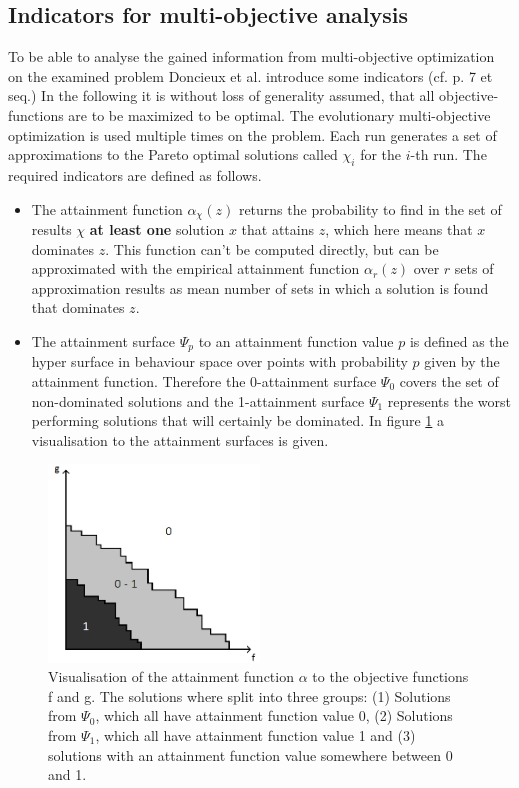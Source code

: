 \documentclass[12pt,twoside]{article}
\theoremstyle{plain}
\theoremstyle{definition}
\theoremstyle{remark}
\begin{document}
\subsection{Indicators for multi-objective analysis}
\label{back:indicators}
To be able to analyse the gained information from multi-objective optimization on the examined problem Doncieux et al. introduce some indicators (cf. \cite{doncieux2015multi} p. 7 et seq.)
In the following it is without loss of generality assumed, that all objective-functions are to be maximized to be optimal.
The evolutionary multi-objective optimization is used multiple times on the problem. Each run generates a set of approximations to the Pareto optimal solutions called $\chi_i$ for the $i$-th run.
The required indicators are defined as follows.
\begin{itemize}
	\item The attainment function $\alpha_\chi(z)$ returns the probability to find in the set of results $\chi$ \textbf{at least one} solution $x$ that attains $z$, which here means that $x$ dominates $z$. This function can't be computed directly, but can be approximated with the empirical attainment function $\alpha_r(z)$ over $r$ sets of approximation results as mean number of sets in which a solution is found that dominates $z$.
	\item The attainment surface $\Psi_p$ to an attainment function value $p$ is defined as the hyper surface in behaviour space over points with probability $p$ given by the attainment function.
	Therefore the 0-attainment surface $\Psi_0$ covers the set of non-dominated solutions and the 1-attainment surface $\Psi_1$ represents the worst performing solutions that will certainly be dominated.
	In figure \ref{fig:attainment1} a visualisation to the attainment surfaces is given.
\end{itemize}
\begin{figure}[h!]
	\vspace*{-0.5cm}
	\begin{center}
		\includegraphics[width=0.5\textwidth]{Bilder/attainment_surfaces.png}
	\end{center}
	\vspace*{-0.9cm}
	\caption{Visualisation of the attainment function $\alpha$ to the objective functions f and g. The solutions where split into three groups: (1) Solutions from $\Psi_0$, which all have attainment function value 0, (2) Solutions from $\Psi_1$, which all have attainment function value 1 and (3) solutions with an attainment function value somewhere between 0 and 1.} 
	\label{fig:attainment1}
\end{figure}
\end{document}
